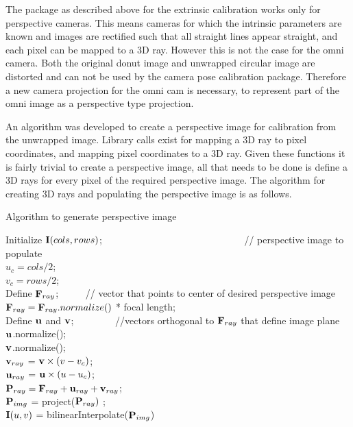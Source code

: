 The package as described above for the extrinsic calibration works only for perspective cameras. This means cameras for which the intrinsic parameters are known and images are rectified such that all straight lines appear straight, and each pixel can be mapped to a 3D ray.  However this is not the case for the omni camera.  Both the original donut image and unwrapped circular image are distorted and can not be used by the camera pose calibration package.  Therefore a new camera projection for the omni cam is necessary, to represent part of the omni image as a perspective type projection.

An algorithm was developed to create a perspective image for calibration from the unwrapped image.  Library calls exist for mapping a 3D ray to pixel coordinates, and mapping pixel coordinates to a 3D ray.  Given these functions it is fairly trivial to create a perspective image, all that needs to be done is define a 3D rays for every pixel of the required perspective image.  The algorithm for creating 3D rays and populating the perspective image is as follows.

\begin{algorithm}[h!]
 \caption{Algorithm to generate perspective image}
 Initialize $\mathbf I(cols,rows)$; \ \ \ \ \ \ \ \ \ \ \ \ \ \ \ \ \ \ \ \ \ \ \ \ \ \ \ \ \ 
 // perspective image to populate \\
 $u_c = cols/2$;  \\
 $v_c = rows/2$;  \\
 Define $\mathbf F_{ray}$; \ \ \ \ \ 
 // vector that points to center of desired perspective image \\
 $\mathbf F_{ray} = \mathbf F_{ray}.normalize()$ * focal length; \ \ \ \ \ \ \ \ \ \ \ \ \ \ \ \ \\
 Define $\mathbf u$ and $\mathbf v$; \ \ \ \ \ \ \ \ 
 //vectors orthogonal to $\mathbf F_{ray}$ that define image plane \\
 $\mathbf u$.normalize(); \\
 $\mathbf v$.normalize(); \\
 \For{v = 0 to rows}
 {
   $\mathbf v_{ray}$ = $\mathbf v \times (v - v_c)$; \\
   {
     $\mathbf u_{ray}$ = $\mathbf u \times (u - u_c)$; \\
     $\mathbf P_{ray} = \mathbf F_{ray} + \mathbf u_{ray} + \mathbf v_{ray}$; \\
     $\mathbf P_{img}$ = project($\mathbf P_{ray})$ ; \\
     $\mathbf I(u,v)$ = bilinearInterpolate($\mathbf P_{img}$)
   }
 }
\end{algorithm}

